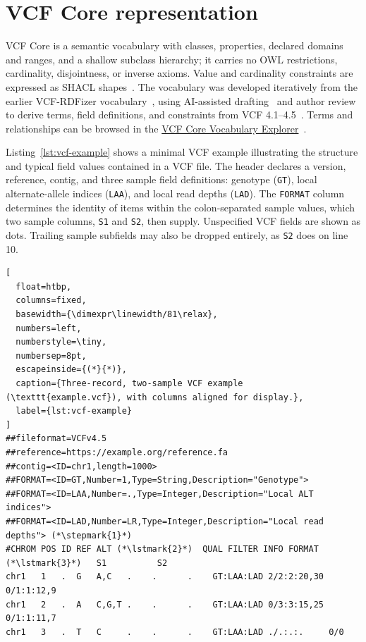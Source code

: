 \section{VCF Core representation}
\label{sec:methods}

\label{sec:design}
\label{sec:profiles}

VCF Core is a semantic vocabulary with classes, properties, declared domains and ranges, and a shallow subclass hierarchy; it carries no OWL restrictions, cardinality, disjointness, or inverse axioms.
Value and cardinality constraints are expressed as SHACL shapes~\cite{shacl2017}.
The vocabulary was developed iteratively from the earlier VCF-RDFizer vocabulary~\cite{crum2025semantifying}, using AI-assisted drafting~\cite{anthropic2026claudeopus5,openai2026gpt6astra} and author review to derive terms, field definitions, and constraints from VCF 4.1--4.5~\cite{htsspecs,vcf45}.
Terms and relationships can be browsed in the \href{https://ecrum19.github.io/vcf-core-vocabulary/}{VCF Core Vocabulary Explorer}~\cite{ocg2026}.

Listing~\ref{lst:vcf-example} shows a minimal VCF example illustrating the structure and typical field values contained in a VCF file.
The header declares a version, reference, contig, and three sample field definitions: genotype (\texttt{GT}), local alternate-allele indices (\texttt{LAA}), and local read depths (\texttt{LAD}).
The \texttt{FORMAT} column determines the identity of items within the colon-separated sample values, which two sample columns, \texttt{S1} and \texttt{S2}, then supply.
Unspecified VCF fields are shown as dots.
Trailing sample subfields may also be dropped entirely, as \texttt{S2} does on line 10.

\begin{lstlisting}[
  float=htbp,
  columns=fixed,
  basewidth={\dimexpr\linewidth/81\relax},
  numbers=left,
  numberstyle=\tiny,
  numbersep=8pt,
  escapeinside={(*}{*)},
  caption={Three-record, two-sample VCF example (\texttt{example.vcf}), with columns aligned for display.},
  label={lst:vcf-example}
]
##fileformat=VCFv4.5  
##reference=https://example.org/reference.fa
##contig=<ID=chr1,length=1000>
##FORMAT=<ID=GT,Number=1,Type=String,Description="Genotype">
##FORMAT=<ID=LAA,Number=.,Type=Integer,Description="Local ALT indices">
##FORMAT=<ID=LAD,Number=LR,Type=Integer,Description="Local read depths"> (*\stepmark{1}*)
#CHROM POS ID REF ALT (*\lstmark{2}*)  QUAL FILTER INFO FORMAT  (*\lstmark{3}*)   S1          S2
chr1   1   .  G   A,C   .    .      .    GT:LAA:LAD 2/2:2:20,30 0/1:1:12,9
chr1   2   .  A   C,G,T .    .      .    GT:LAA:LAD 0/3:3:15,25 0/1:1:11,7
chr1   3   .  T   C     .    .      .    GT:LAA:LAD ./.:.:.     0/0
\end{lstlisting}

